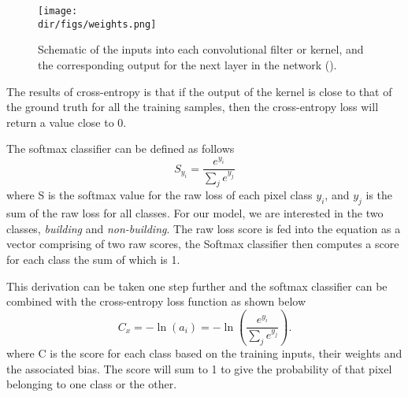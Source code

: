 \begin{figure}[htbp]
    \centering
    \texttt{[image: \\dir/figs/weights.png]}
    \caption[Schematic Convolutional Neuron]{Schematic of the inputs into each convolutional filter or kernel, and the corresponding output for the next layer in the network (\cite{nielsen15}).}
    \label{fig.weights}
\end{figure}

The results of cross-entropy is that if the output of the kernel is close to that of the ground truth for all the training samples, then the cross-entropy loss will return a value close to 0.
\par
The softmax classifier can be defined as follows
\[S_{y_i} = \frac{e^{y_i}}{\sum_j e^{y_j}}\]
where S is the softmax value for the raw loss of each pixel class $y_i$, and $y_j$ is the sum of the raw loss for all classes. For our model, we are interested in the two classes, \textit{building} and \textit{non-building}. The raw loss score is fed into the equation as a vector comprising of two raw scores, the Softmax classifier then computes a score for each class the sum of which is 1.
\par
This derivation can be taken one step further and the softmax classifier can be combined with the cross-entropy loss function as shown below
\[C_x=-\ln(a_i)=-\ln\left(\frac{e^{y_i}}{\sum_je^{y_j}}\right).\]
where C is the score for each class based on the training inputs, their weights and the associated bias. The score will sum to 1 to give the probability of that pixel belonging to one class or the other.

